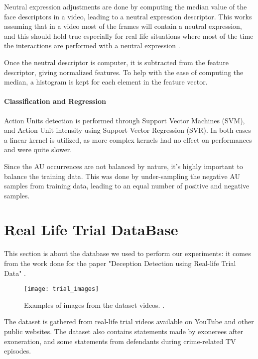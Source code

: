 Neutral expression adjustments are done by computing the median value of the face descriptors in a video, leading to a neutral expression descriptor. This works assuming that in a video most of the frames will contain a neutral expression, and this should hold true especially for real life situations where most of the time the interactions are performed with a neutral expression \cite{NatAffData}.

Once the neutral descriptor is computer, it is subtracted from the feature descriptor, giving normalized features. To help with the ease of computing the median, a histogram is kept for each element in the feature vector.

\paragraph{Classification and Regression}
Action Units detection is performed through Support Vector Machines (SVM), and Action Unit intensity using Support Vector Regression (SVR). In both cases a linear kernel is utilized, as more complex kernels had no effect on performances and were quite slower. 

Since the AU occurrences are not balanced by nature, it's highly important to balance the training data. This was done by under-sampling the negative AU samples from training data, leading to an equal number of positive and negative samples.

\section{Real Life Trial DataBase} \label{rldb}
This section is about the database we used to perform our experiments: it comes from the work done for the paper "Deception Detection using Real-life Trial Data" \cite{Perez-Rosas:2015:DDU:2818346.2820758}.

\begin{figure}[H]
	\centering
	\texttt{[image: trial\_images]}
	\caption{Examples of images from the dataset videos. \cite{Perez-Rosas:2015:DDU:2818346.2820758}.}
	\label{fig:trial_images}
\end{figure}


The dataset is gathered from real-life trial videos available on YouTube and other public websites. The dataset also contains statements made by exonerees after exoneration, and some statements from defendants during crime-related TV episodes.

